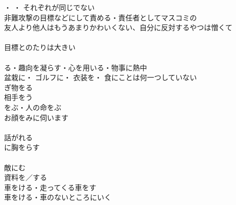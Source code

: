 ・
・
それぞれが同じでない\\

非難攻撃の目標などにして責める・責任者としてマスコミの\\

友人より他人はもうあまりかわいくない、自分に反対するやつは憎くて\\

\\
目標とのたりは大きい\\

\\

る・趣向を凝らす・心を用いる・物事に熱中\\
盆栽に・
ゴルフに・
衣装を・
食にことは何一つしていない\\

ぎ物をる\\
相手をう\\
をぶ・人の命をぶ\\
お顔をみに伺います\\
\\
話がれる\\
に胸をらす\\
\\
敵にむ\\
資料を／する\\
車をける・走ってくる車をす\\
車をける・車のないところにいく\\
\\






\clearpage

